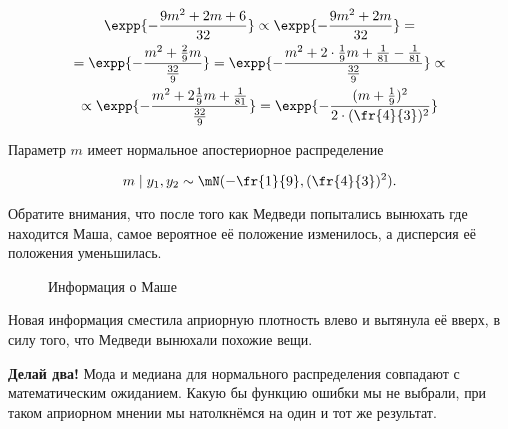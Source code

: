 \begin{multline*}
\expp{-\frac{9m^2 + 2m + 6}{32}} \propto \expp{-\frac{9m^2 + 2m}{32}}  = \\ = \expp{-\frac{m^2+\frac{2}{9} m}{\frac{32}{9}}}  = \expp{-\frac{m^2+ 2 \cdot \frac{1}{9} m + \frac{1}{81} - \frac{1}{81}}{\frac{32}{9}}} \propto  \\ \propto  \expp{-\frac{m^2+ 2 \frac{1}{9} m + \frac{1}{81}}{\frac{32}{9}}} = \expp{-\frac{(m + \frac{1}{9})^2}{2 \cdot (\fr{4}{3})^2}}
\end{multline*}

Параметр $m$ имеет нормальное апостериорное распределение

\[m \mid y_1, y_2 \sim \mN(-\fr{1}{9},(\fr{4}{3})^2).\] 

 Обратите внимания, что после того как Медведи попытались вынюхать где находится Маша, самое вероятное её положение изменилось, а дисперсия её положения уменьшилась.

\begin{figure}[h!]
\begin{center}
\end{center}
\caption{Информация  о Маше}
\end{figure}

Новая информация сместила априорную плотность влево и вытянула её вверх, в силу того, что Медведи вынюхали похожие вещи.

\textbf{Делай два!} Мода и медиана для нормального распределения совпадают с математическим ожиданием. Какую бы функцию ошибки мы не выбрали, при таком априорном мнении мы натолкнёмся на один и тот же результат.

